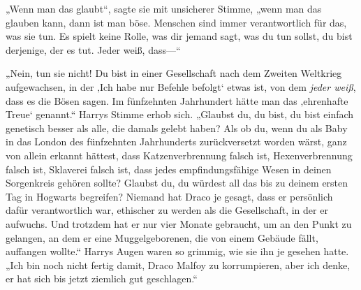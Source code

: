 „Wenn man das glaubt“, sagte sie mit unsicherer Stimme, „wenn man das glauben kann, dann ist man böse. Menschen sind immer verantwortlich für das, was sie tun. Es spielt keine Rolle, was dir jemand sagt, was du tun sollst, du bist derjenige, der es tut. Jeder weiß, dass—“

„Nein, tun sie nicht! Du bist in einer Gesellschaft nach dem Zweiten Weltkrieg aufgewachsen, in der ‚Ich habe nur Befehle befolgt‘ etwas ist, von dem \emph{jeder weiß}, dass es die Bösen sagen. Im fünfzehnten Jahrhundert hätte man das ‚ehrenhafte Treue‘ genannt.“
Harrys Stimme erhob sich.
„Glaubst du, du bist, du bist einfach genetisch besser als alle, die damals gelebt haben? Als ob du, wenn du als Baby in das London des fünfzehnten Jahrhunderts zurückversetzt worden wärst, ganz von allein erkannt hättest, dass Katzenverbrennung falsch ist, Hexenverbrennung falsch ist, Sklaverei falsch ist, dass jedes empfindungsfähige Wesen in deinen Sorgenkreis gehören sollte? Glaubst du, du würdest all das bis zu deinem ersten Tag in Hogwarts begreifen? Niemand hat Draco je gesagt, dass er persönlich dafür verantwortlich war, ethischer zu werden als die Gesellschaft, in der er aufwuchs. Und trotzdem hat er nur vier Monate gebraucht, um an den Punkt zu gelangen, an dem er eine Muggelgeborenen, die von einem Gebäude fällt, auffangen wollte.“
Harrys Augen waren so grimmig, wie sie ihn je gesehen hatte.
„Ich bin noch nicht fertig damit, Draco Malfoy zu korrumpieren, aber ich denke, er hat sich bis jetzt ziemlich gut geschlagen.“

